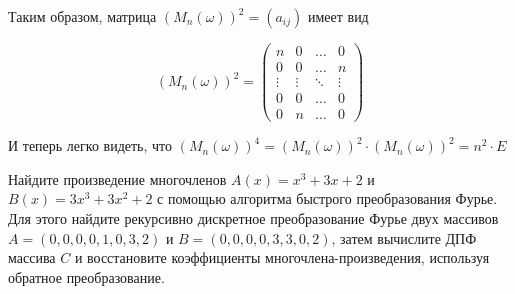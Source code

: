 \documentclass[a4paper,12pt]{article}
\begin{document}
\begin{solution}
Таким образом, матрица $(M_n(\omega))^2 = (a_{ij})$ имеет вид

\begin{equation*}
(M_n(\omega))^2 = \left(
\begin{array}{ccccc}
n & 0 & \ldots & 0\\
0 & 0 & \ldots & n\\
\vdots & \vdots & \ddots & \vdots\\
0 & 0 & \ldots & 0 \\
0 & n & \ldots & 0
\end{array}
\right)
\end{equation*}

И теперь легко видеть, что $(M_n(\omega))^4 = (M_n(\omega))^2 \cdot (M_n(\omega))^2 = n^2 \cdot E$

\end{solution}

\begin{task}
	Найдите произведение многочленов $A(x) = x^3+3x+2$ и $B(x)=3x^3+3x^2+2$ с помощью алгоритма быстрого преобразования Фурье. Для этого найдите рекурсивно дискретное преобразование Фурье двух массивов $A=(0,0,0,0,1,0,3,2)$ и $B=(0,0,0,0,3,3,0,2)$, затем вычислите ДПФ массива $C$ и восстановите коэффициенты многочлена-произведения, используя обратное преобразование.
\end{task}
\end{document}
